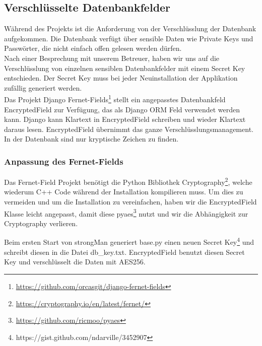 \subsection{Verschlüsselte Datenbankfelder}
Während des Projekts ist die Anforderung von der Verschlüsslung der Datenbank aufgekommen. Die Datenbank verfügt über sensible Daten wie Private Keys und Passwörter, die nicht einfach offen gelesen werden dürfen.\\


Nach einer Besprechung mit unserem Betreuer, haben wir uns auf die Verschlüsslung von einzelnen sensiblen Datenbankfelder mit einem Secret Key entschieden. Der Secret Key muss bei jeder Neuinstallation der Applikation zufällig generiert werden.\\


Das Projekt  Django Fernet-Fields\footnote{\url{https://github.com/orcasgit/django-fernet-fields}} stellt ein angepasstes Datenbankfeld EncryptedField zur Verfügung, das als Django ORM Feld verwendet werden kann. Django kann Klartext in EncryptedField schreiben und wieder Klartext daraus lesen. EncryptedField übernimmt das ganze Verschlüsslungsmanagement. In der Datenbank sind nur kryptische Zeichen zu finden.

\subsubsection{Anpassung des Fernet-Fields}
Das Fernet-Field Projekt benötigt die Python Bibliothek Cryptography\footnote{\url{https://cryptography.io/en/latest/fernet/}}, welche wiederum C++ Code während der Installation kompilieren muss. Um dies zu vermeiden und um die Installation zu vereinfachen, haben wir die EncryptedField Klasse leicht angepasst, damit diese pyaes\footnote{\url{https://github.com/ricmoo/pyaes}} nutzt und wir die Abhängigkeit zur Cryptography verlieren.

Beim ersten Start von strongMan generiert base.py einen neuen Secret Key\footnote{https://gist.github.com/ndarville/3452907} und schreibt diesen in die Datei db\_key.txt.
EncryptedField benutzt diesen Secret Key und verschlüsselt die Daten mit AES256.
\newpage